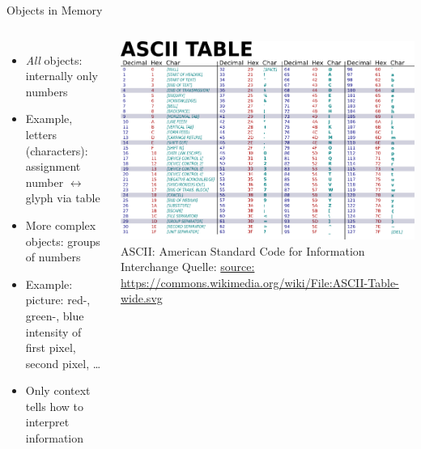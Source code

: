 
\begin{frame}[fragile]{Objects in Memory}
%
\begin{columns}
	\begin{itemize}
	\item \emph{All} objects: internally only numbers
	\item Example, letters (characters): 
		assignment number $\leftrightarrow$ glyph via table
	\item More complex objects: groups of numbers
	\item Example: picture: red-, green-, blue intensity of first pixel, second pixel, \ldots
	\item Only context tells how to interpret information
	\end{itemize}
	\includegraphics[width=\linewidth]{./gfx/ASCII_table}\newline
	\tiny ASCII: American Standard Code for Information Interchange\newline
	Quelle: \url{source: https://commons.wikimedia.org/wiki/File:ASCII-Table-wide.svg}
\end{columns}
%
\end{frame}


